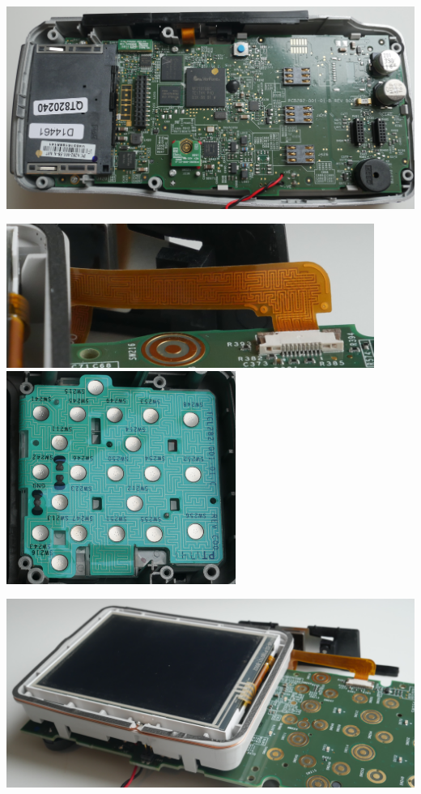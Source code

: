 \documentclass[12pt,aspectratio=169]{beamer}
\begin{document}
\begin{frame}
\centering
\includegraphics[width=14cm]{media/pcb_noshield}
\end{frame}

\begin{frame}
\centering
\includegraphics[width=12cm]{media/magstripe_connector3_crop}
\includegraphics[width=7.5cm]{media/pinpad_squigglies}
\end{frame}

\begin{frame}
\centering
\includegraphics[width=14cm]{media/screen_coil}
\end{frame}
\end{document}
